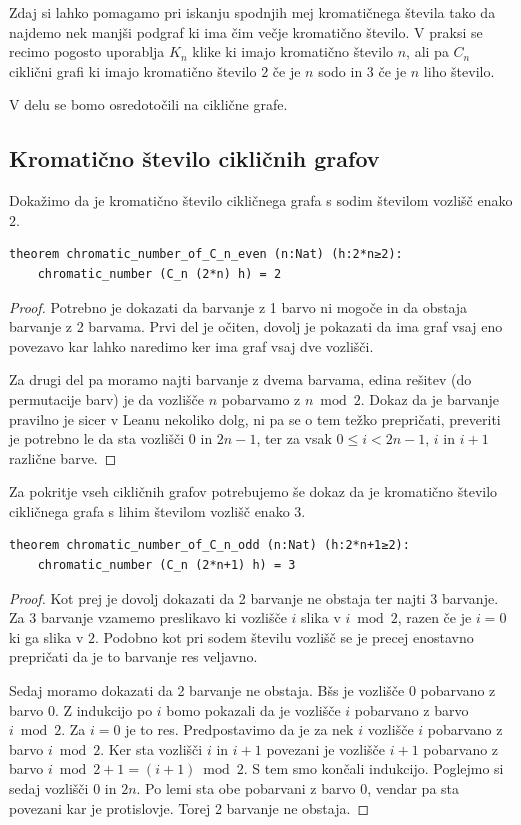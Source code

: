 \documentclass[mat1]{fmfdelo}
\begin{document}
Zdaj si lahko pomagamo pri iskanju spodnjih mej kromatičnega števila tako da najdemo nek manjši podgraf ki 
ima čim večje kromatično število. V praksi se recimo pogosto uporablja $K_n$ klike ki imajo kromatično število $n$, 
ali pa $C_n$ ciklični grafi ki imajo kromatično število $2$ če je $n$ sodo in $3$ če je $n$ liho število.

V delu se bomo osredotočili na ciklične grafe.

\subsection{Kromatično število cikličnih grafov}
Dokažimo da je kromatično število cikličnega grafa s sodim številom vozlišč enako $2$.
\begin{lstlisting}
theorem chromatic_number_of_C_n_even (n:Nat) (h:2*n≥2):
    chromatic_number (C_n (2*n) h) = 2
\end{lstlisting}
\begin{proof}
Potrebno je dokazati da barvanje z 1 barvo ni mogoče in da obstaja barvanje z 2 barvama.
Prvi del je očiten, dovolj je pokazati da ima graf vsaj eno povezavo kar lahko naredimo ker ima graf vsaj dve vozlišči.

Za drugi del pa moramo najti barvanje z dvema barvama, edina rešitev (do permutacije barv) je da vozlišče
$n$ pobarvamo z $n\bmod 2$. Dokaz da je barvanje pravilno je sicer v Leanu nekoliko dolg, ni pa se o tem
težko prepričati, preveriti je potrebno le da sta vozlišči $0$ in $2n-1$, ter za vsak $0\le i<2n-1$, $i$ in $i+1$ različne barve.
\end{proof}

Za pokritje vseh cikličnih grafov potrebujemo še dokaz da je kromatično število cikličnega grafa s lihim številom vozlišč enako $3$.
\begin{lstlisting}
theorem chromatic_number_of_C_n_odd (n:Nat) (h:2*n+1≥2):
    chromatic_number (C_n (2*n+1) h) = 3
\end{lstlisting}
\begin{proof}
Kot prej je dovolj dokazati da 2 barvanje ne obstaja ter najti 3 barvanje. 
Za 3 barvanje vzamemo preslikavo ki vozlišče $i$ slika v $i\bmod 2$, razen če je $i=0$ ki ga slika v $2$.
Podobno kot pri sodem številu vozlišč se je precej enostavno prepričati da je to barvanje res veljavno. 

Sedaj moramo dokazati da 2 barvanje ne obstaja. Bšs je vozlišče $0$ pobarvano z barvo $0$.
Z indukcijo po $i$ bomo pokazali da je vozlišče $i$ pobarvano z barvo $i\bmod 2$.
Za $i=0$ je to res. Predpostavimo da je za nek $i$ vozlišče $i$ pobarvano z barvo $i\bmod 2$.
Ker sta vozlišči $i$ in $i+1$ povezani je vozlišče $i+1$ pobarvano z barvo $i\bmod 2 + 1 = (i+1)\bmod 2$.
S tem smo končali indukcijo.
Poglejmo si sedaj vozlišči $0$ in $2n$. Po lemi sta obe pobarvani z barvo $0$, vendar pa sta povezani kar je protislovje.
Torej 2 barvanje ne obstaja. 
\end{proof}
\end{document}

